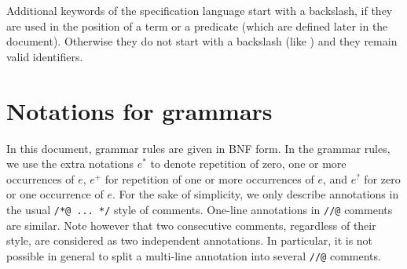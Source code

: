 Additional keywords of the specification language start with a
backslash, if they are used in the position of a term or a predicate
(which are defined later in the document).  Otherwise they do not start
with a backslash (like \ensures{}) and they remain valid identifiers.

\section{Notations for grammars}

In this document, grammar rules are given in BNF form. In the grammar
rules, we use the extra notations $e^*$ to denote repetition of zero, one
or more occurrences of $e$, $e^+$ for repetition of one or more
occurrences of $e$, and $e^?$ for zero or one occurrence of $e$.  For
the sake of simplicity, we only describe annotations in the usual
\lstinline|/*@ ... */| style of comments. One-line annotations
in \lstinline|//@| comments are similar. Note however that two consecutive
comments, regardless of their style, are considered as two independent
annotations. In particular, it is not possible in general to split a multi-line
annotation into several \lstinline|//@| comments.


